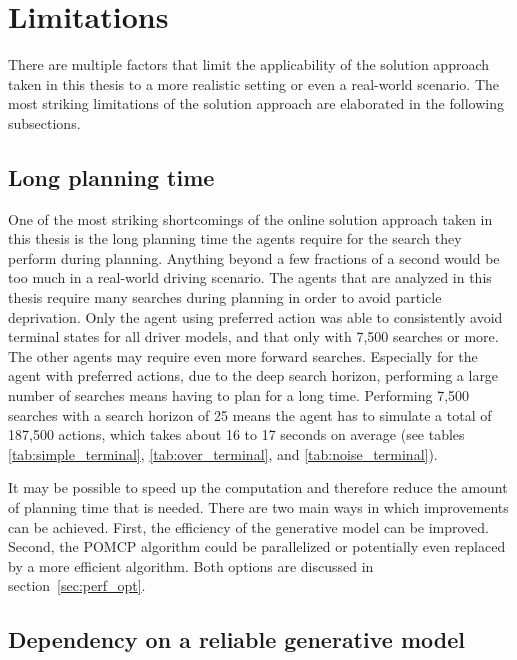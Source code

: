 \section{Limitations}
\label{sec:limitations}

There are multiple factors that limit the applicability of the solution approach taken in this thesis to a more realistic setting or even a real-world scenario. The most striking limitations of the solution approach are elaborated in the following subsections.


\subsection{Long planning time}


One of the most striking shortcomings of the online solution approach taken in this thesis is the long planning time the agents require for the search they perform during planning. Anything beyond a few fractions of a second would be too much in a real-world driving scenario. The agents that are analyzed in this thesis require many searches during planning in order to avoid particle deprivation. Only the agent using preferred action was able to consistently avoid terminal states for all driver models, and that only with 7,500 searches or more. The other agents may require even more forward searches. Especially for the agent with preferred actions, due to the deep search horizon, performing a large number of searches means having to plan for a long time. Performing 7,500 searches with a search horizon of 25 means the agent has to simulate a total of 187,500 actions, which takes about 16 to 17 seconds on average (see tables \ref{tab:simple_terminal}, \ref{tab:over_terminal}, and \ref{tab:noise_terminal}).

It may be possible to speed up the computation and therefore reduce the amount of planning time that is needed. There are two main ways in which improvements can be achieved. First, the efficiency of the generative model can be improved. Second, the POMCP algorithm could be parallelized or potentially even replaced by a more efficient algorithm. Both options are discussed in section~\ref{sec:perf_opt}. 

\subsection{Dependency on a reliable generative model}

